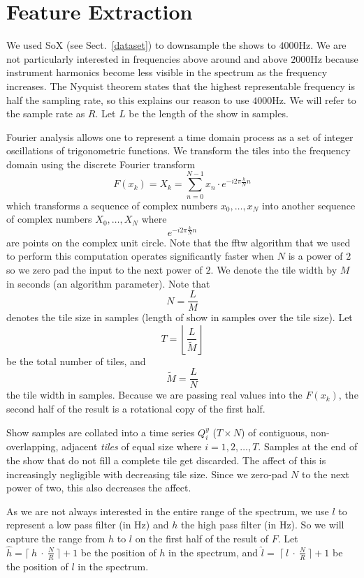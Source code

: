 \documentclass[twocolumn]{article}
\begin{document}
	\section{Feature Extraction}\label{feat_ex} %
	
	We used SoX (see Sect.~\ref{dataset}) to downsample the shows to $4000$Hz. We are not particularly interested in frequencies above around and above $2000$Hz because instrument harmonics become less visible in the spectrum as the frequency increases. The Nyquist theorem \cite{nyquist1928certain} states that the highest representable frequency is half the sampling rate, so this explains our reason to use $4000$Hz. We will refer to the sample rate as $R$. Let $L$ be the length of the show in samples.
	
	Fourier analysis allows one to represent a time domain process as a set of integer oscillations of trigonometric functions. We transform the tiles into the frequency domain using the discrete Fourier transform
\[
F(x_k) = X_k = \sum_{n=0}^{N-1} x_n \cdot e^{-i 2 \pi \frac{k}{N} n}
\] which transforms a sequence of complex numbers $x_0,\ldots,x_N$ into another sequence of complex numbers $X_0,\ldots,X_N$ where $$e^{-i 2 \pi \frac{k}{N} n}$$ are points on the complex unit circle. Note that the fftw algorithm \cite{frigo2004fftw} that we used to perform this computation operates significantly faster when $N$ is a power of $2$ so we zero pad the input to the next power of $2$. We denote the tile width by $M$ in seconds (an algorithm parameter). Note that
\[
N = \frac{L}{M}
\] denotes the tile size in samples (length of show in samples over the tile size). Let 
\[
T = \left\lfloor\frac{L}{\tilde{M}}\right\rfloor
\] be the total number of tiles, and \[
\tilde{M}=\frac{L}{N}
\] the tile width in samples.
Because we are passing real values into the $F(x_k)$, the second half of the result is a rotational copy of the first half.
	
	Show samples are collated into a time series $Q_i^y$ ($T \times N$) of contiguous, non-overlapping, adjacent \emph{tiles} of equal size where $i=1,2,\ldots, T$. Samples at the end of the show that do not fill a complete tile get discarded. The affect of this is increasingly negligible with decreasing tile size. Since we zero-pad $N$ to the next power of two, this also decreases the affect.
	
	As we are not always interested in the entire range of the spectrum, we use $l$ to represent a low pass filter (in Hz) and $h$ the high pass filter (in Hz). So we will capture the range from $h$ to $l$ on the first half of the result of $F$. Let $\hat{h} = \lceil~h~\cdot~\frac{{N}}{R} ~\rceil+1$ be the position of $h$ in the spectrum, and $\hat l=~\lceil~l~\cdot~\frac{{N}}{R}~\rceil+1$ be the position of $l$ in the spectrum.
	
\end{document}

